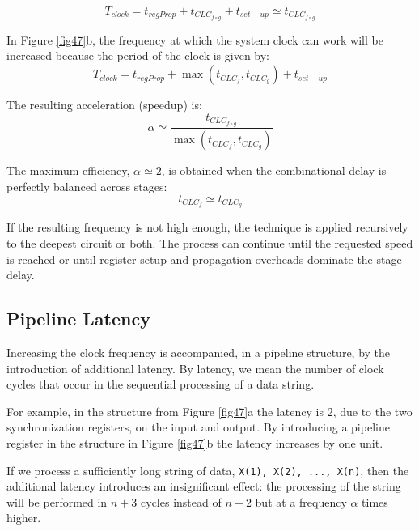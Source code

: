 
\begin{equation}
    T_{clock} = t_{regProp} + t_{CLC_{f \circ g}} + t_{set-up} \simeq t_{CLC_{f \circ g}}
\end{equation}

In Figure \ref{fig47}b, the frequency at which the system clock can work will be increased because the period of the clock is given by:
\begin{equation}
    T_{clock} = t_{regProp} + \max(t_{CLC_{f}}, t_{CLC_{g}}) + t_{set-up}
\end{equation}

The resulting acceleration (speedup) is:
\begin{equation}
    \alpha \simeq \frac{t_{CLC_{f \circ g}}}{\max(t_{CLC_{f}}, t_{CLC_{g}})}
\end{equation}

The maximum efficiency, $\alpha \simeq 2$, is obtained when the combinational delay is perfectly balanced across stages:
\begin{equation}
    t_{CLC_{f}} \simeq t_{CLC_{g}}
\end{equation}

If the resulting frequency is not high enough, the technique is applied recursively to the deepest circuit or both. The process can continue until the requested speed is reached or until register setup and propagation overheads dominate the stage delay.

\subsection{Pipeline Latency}

Increasing the clock frequency is accompanied, in a pipeline structure, by the introduction of additional latency. By latency, we mean the number of clock cycles that occur in the sequential processing of a data string.

For example, in the structure from Figure \ref{fig47}a the latency is 2, due to the two synchronization registers, on the input and output. By introducing a pipeline register in the structure in Figure \ref{fig47}b the latency increases by one unit.

If we process a sufficiently long string of data, \texttt{X(1), X(2), ..., X(n)}, then the additional latency introduces an insignificant effect: the processing of the string will be performed in $n+3$ cycles instead of $n+2$ but at a frequency $\alpha$ times higher.

